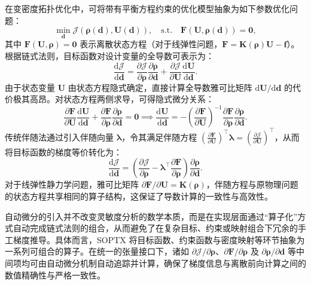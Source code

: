 在变密度拓扑优化中，可将带有平衡方程约束的优化模型抽象为如下参数优化问题：
\[
\min_{\boldsymbol{d}} \mathcal{J}(\boldsymbol{\rho}(\boldsymbol{d}), \boldsymbol{U}(\boldsymbol{d})), \quad \text{s.t.} \quad \boldsymbol{F}(\boldsymbol{U}, \boldsymbol{\rho}(\boldsymbol{d})) = \mathbf{0},
\]
其中 $\boldsymbol{F}(\boldsymbol{U}, \boldsymbol{\rho}) = \mathbf{0}$ 表示离散状态方程（对于线弹性问题，$\boldsymbol{F} = \boldsymbol{K}(\boldsymbol{\rho})\boldsymbol{U} - \boldsymbol{f}$）。根据链式法则，目标函数对设计变量的全导数可表示为：
\[
\frac{\mathrm{d}\mathcal{J}}{\mathrm{d}\boldsymbol{d}} = \frac{\partial \mathcal{J}}{\partial \boldsymbol{\rho}} \frac{\partial \boldsymbol{\rho}}{\partial \boldsymbol{d}} + \frac{\partial \mathcal{J}}{\partial \boldsymbol{U}} \frac{\mathrm{d}\boldsymbol{U}}{\mathrm{d}\boldsymbol{d}}.
\]
由于状态变量 $\boldsymbol{U}$ 由状态方程隐式确定，直接计算全导数雅可比矩阵 $\mathrm{d}\boldsymbol{U}/\mathrm{d}\boldsymbol{d}$ 的代价极其高昂。对状态方程两侧求导，可得隐式微分关系：
\[
\frac{\partial \boldsymbol{F}}{\partial \boldsymbol{U}} \frac{\mathrm{d}\boldsymbol{U}}{\mathrm{d}\boldsymbol{d}} + \frac{\partial \boldsymbol{F}}{\partial \boldsymbol{\rho}} \frac{\partial \boldsymbol{\rho}}{\partial \boldsymbol{d}} = \mathbf{0} \implies \frac{\mathrm{d}\boldsymbol{U}}{\mathrm{d}\boldsymbol{d}} = - \left( \frac{\partial \boldsymbol{F}}{\partial \boldsymbol{U}} \right)^{-1} \frac{\partial \boldsymbol{F}}{\partial \boldsymbol{\rho}} \frac{\partial \boldsymbol{\rho}}{\partial \boldsymbol{d}}.
\]
传统伴随法通过引入伴随向量 $\boldsymbol{\lambda}$，令其满足伴随方程 $\left( \frac{\partial \boldsymbol{F}}{\partial \boldsymbol{U}} \right)^{\top} \boldsymbol{\lambda} = \left( \frac{\partial \mathcal{J}}{\partial \boldsymbol{U}} \right)^{\top}$，从而将目标函数的梯度等价转化为：
\[
\frac{\mathrm{d}\mathcal{J}}{\mathrm{d}\boldsymbol{d}} = \left( \frac{\partial \mathcal{J}}{\partial \boldsymbol{\rho}} - \boldsymbol{\lambda}^{\top} \frac{\partial \boldsymbol{F}}{\partial \boldsymbol{\rho}} \right) \frac{\partial \boldsymbol{\rho}}{\partial \boldsymbol{d}}.
\]
对于线弹性静力学问题，雅可比矩阵 $\partial \boldsymbol{F}/\partial \boldsymbol{U} = \boldsymbol{K}(\boldsymbol{\rho})$，伴随方程与原物理问题的状态方程共享相同的算子结构，这保证了导数计算的一致性与高效性。

自动微分的引入并不改变灵敏度分析的数学本质，而是在实现层面通过“算子化”方式自动完成链式法则的组合，从而避免了在复杂目标、约束或映射组合下冗余的手工梯度推导。具体而言，SOPTX 将目标函数、约束函数与密度映射等环节抽象为一系列可组合的算子。在统一的张量接口下，诸如 $\partial \mathcal{J}/\partial \boldsymbol{\rho}$、$\partial \boldsymbol{F}/\partial \boldsymbol{\rho}$ 及 $\partial \boldsymbol{\rho}/\partial \boldsymbol{d}$ 等中间项均可由自动微分机制自动追踪并计算，确保了梯度信息与离散前向计算之间的数值精确性与严格一致性。

